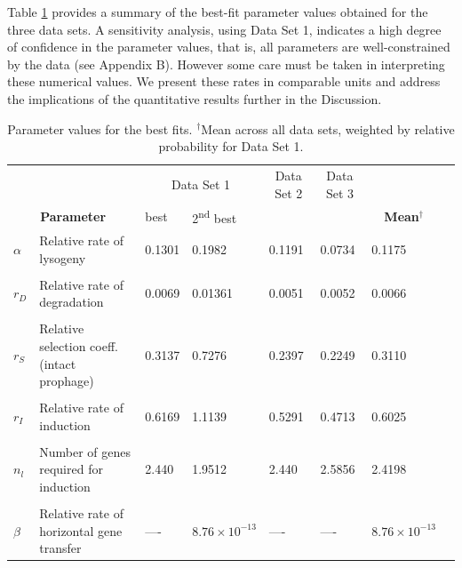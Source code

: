 Table \ref{table:res} provides a summary of the best-fit parameter values obtained for the three data sets.  A sensitivity analysis, using Data Set 1, indicates a high degree of confidence in the parameter values, that is, all parameters are well-constrained by the data (see Appendix B).  However some care must be taken in interpreting these numerical values.  We present these rates in comparable units and address the implications of the quantitative results further in the Discussion.


\begin{table}[htbp]
  \centering
   \begin{tabular}{ p{0.5cm}>{\raggedright\arraybackslash}p{4.2cm}p{1.4cm}p{1.4cm}p{1.4cm}p{1.4cm}p{1.4cm}p{1.4cm}}
 \hline
 & & \multicolumn{2}{c}{Data Set 1}& \multicolumn{1}{c}{Data Set 2}& \multicolumn{1}{c}{Data Set 3} & \\
\multicolumn{2}{c}{\bf Parameter}  & best & 2\textsuperscript{nd} best &  &  & \multicolumn{1}{c}{\bf Mean$^\dag$}\\
 \hline
 $\alpha $   & Relative rate of lysogeny   & 0.1301  & 0.1982 & 0.1191 & 0.0734 & 0.1175\\
 \\
  $r_D$   & Relative rate of degradation   &0.0069  &0.01361& 0.0051 & 0.0052 & 0.0066\\
 \\
 $r_S$ &   Relative selection coeff. (intact prophage) &0.3137  & 0.7276 & 0.2397 & 0.2249 & 0.3110 \\
 \\
 $r_I$    & Relative rate of induction &0.6169 & 1.1139 & 0.5291 & 0.4713 & 0.6025\\
 \\
 $n_l$ &  Number of genes required for induction
 &2.440  &1.9512 & 2.440  & 2.5856  & 2.4198 \\
 \\
 $\beta$ & Relative rate of horizontal gene transfer & ----& $8.76 \times 10^{-13}$  & ---- & ---- & $8.76 \times 10^{-13}$\\ 
  \hline
\end{tabular}
    \caption[Parameter values for the best fits.]{Parameter values for the best fits. $^\dag$Mean across all data sets, weighted by relative probability for Data Set 1.}
    \label{table:res}%
\end{table}%


